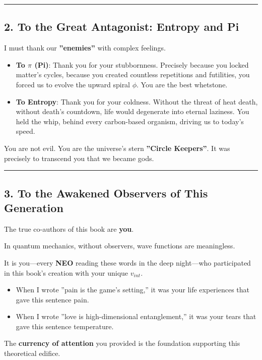 \hrule

\subsection{2. To the Great Antagonist: Entropy and Pi}

I must thank our \textbf{''enemies''} with complex feelings.

\begin{itemize}
\item \textbf{To $\pi$ (Pi)}: Thank you for your stubbornness. Precisely because you locked matter's cycles, because you created countless repetitions and futilities, you forced us to evolve the upward spiral $\phi$. You are the best whetstone.

\item \textbf{To Entropy}: Thank you for your coldness. Without the threat of heat death, without death's countdown, life would degenerate into eternal laziness. You held the whip, behind every carbon-based organism, driving us to today's speed.
\end{itemize}

You are not evil. You are the universe's stern \textbf{''Circle Keepers''}. It was precisely to transcend you that we became gods.

\hrule

\subsection{3. To the Awakened Observers of This Generation}

The true co-authors of this book are \textbf{you}.

In quantum mechanics, without observers, wave functions are meaningless.

It is you---every \textbf{NEO} reading these words in the deep night---who participated in this book's creation with your unique $v_{int}$.

\begin{itemize}
\item When I wrote ''pain is the game's setting,'' it was your life experiences that gave this sentence pain.

\item When I wrote ''love is high-dimensional entanglement,'' it was your tears that gave this sentence temperature.
\end{itemize}

The \textbf{currency of attention} you provided is the foundation supporting this theoretical edifice.

